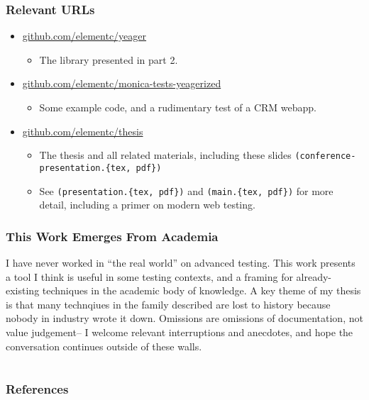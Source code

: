\documentclass{beamer}
\begin{document}
\begin{frame}
  \frametitle{Relevant URLs}
  \begin{itemize}
    \item \url{github.com/elementc/yeager}
    \begin{itemize}
      \item The library presented in part 2.
    \end{itemize}
    \item \url{github.com/elementc/monica-tests-yeagerized}
    \begin{itemize}
      \item Some example code, and a rudimentary test of a CRM webapp.
    \end{itemize}
    \item \url{github.com/elementc/thesis}
    \begin{itemize}
      \item The thesis and all related materials, including these slides \texttt{(conference-presentation.\{tex, pdf\})}
      \item See \texttt{(presentation.\{tex, pdf\})} and \texttt{(main.\{tex, pdf\})} for more detail, including a primer on modern web testing.

    \end{itemize}
  \end{itemize}
\end{frame}

\begin{frame}
  \frametitle{This Work Emerges From Academia}
  I have never worked in ``the real world'' on advanced testing. This work presents a tool I think is useful in some testing contexts, and a framing for already-existing techniques in the academic body of knowledge. A key theme of my thesis is that many technqiues in the family described are lost to history because nobody in industry wrote it down. Omissions are omissions of documentation, not  value judgement-- I welcome relevant interruptions and anecdotes, and hope the conversation continues outside of these walls.
\end{frame}



\section{} %

\begin{frame}[t, allowframebreaks]
\frametitle{References}


\end{frame}
\end{document}
